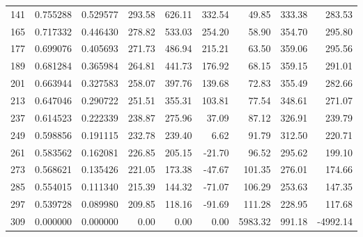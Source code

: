 {\begin{landscape}
\begin{minipage}{\linewidth}
\begin{tabular}{rrrrrrrrr}
    141   & 0.755288 & 0.529577 & 293.58 & 626.11 & 332.54 & 49.85 & 333.38 & 283.53 \\
    165   & 0.717332 & 0.446430 & 278.82 & 533.03 & 254.20 & 58.90 & 354.70 & 295.80 \\
    177   & 0.699076 & 0.405693 & 271.73 & 486.94 & 215.21 & 63.50 & 359.06 & 295.56 \\
    189   & 0.681284 & 0.365984 & 264.81 & 441.73 & 176.92 & 68.15 & 359.15 & 291.01 \\
    201   & 0.663944 & 0.327583 & 258.07 & 397.76 & 139.68 & 72.83 & 355.49 & 282.66 \\
    213   & 0.647046 & 0.290722 & 251.51 & 355.31 & 103.81 & 77.54 & 348.61 & 271.07 \\
    237   & 0.614523 & 0.222339 & 238.87 & 275.96 & 37.09 & 87.12 & 326.91 & 239.79 \\
    249   & 0.598856 & 0.191115 & 232.78 & 239.40 & 6.62  & 91.79 & 312.50 & 220.71 \\
    261   & 0.583562 & 0.162081 & 226.85 & 205.15 & -21.70 & 96.52 & 295.62 & 199.10 \\
    273   & 0.568621 & 0.135426 & 221.05 & 173.38 & -47.67 & 101.35 & 276.01 & 174.66 \\
    285   & 0.554015 & 0.111340 & 215.39 & 144.32 & -71.07 & 106.29 & 253.63 & 147.35 \\
    297   & 0.539728 & 0.089980 & 209.85 & 118.16 & -91.69 & 111.28 & 228.95 & 117.68 \\
    309   & 0.000000 & 0.000000 & 0.00  & 0.00  & 0.00  & 5983.32 & 991.18 & -4992.14 \\
    \bottomrule
    \end{tabular}%
    \label{tab:PVFP_sensitivity}%
    \end{minipage}
    \end{landscape}
    }